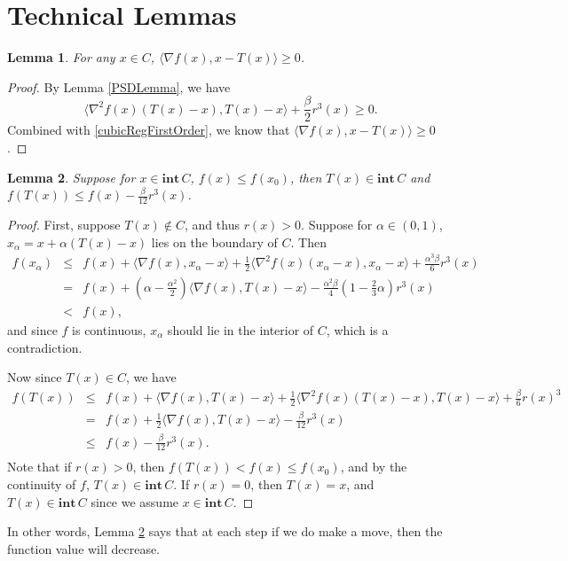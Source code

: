\documentclass[openany]{book}
\newtheorem{lemma}{Lemma}[chapter]
\theoremstyle{definition}
\theoremstyle{remark}
\begin{document}
\section{Technical Lemmas}
\begin{lemma}
    For any $x\in C$, $\langle\nabla f(x),x-T(x)\rangle\ge0$.
\end{lemma}
\begin{proof}
    By Lemma \ref{PSDLemma}, we have
    \begin{equation*}
        \langle\nabla^2f(x)(T(x)-x),T(x)-x\rangle+\frac{\beta}{2}r^3(x)\ge0.
    \end{equation*}
    Combined with \eqref{cubicRegFirstOrder}, we know that $\langle\nabla f(x),x-T(x)\rangle\ge0$.
\end{proof}
\begin{lemma}\label{funcDeltaLemma}
    Suppose for $x\in \mathbf{int}\,C$, $f(x)\le f(x_0)$, then $T(x)\in \mathbf{int}\,C$ and $f(T(x))\le f(x)-\frac{\beta}{12}r^3(x)$.
\end{lemma}
\begin{proof}
    First, suppose $T(x)\not\in C$, and thus $r(x)>0$. Suppose for $\alpha\in(0,1)$, $x_{\alpha}=x+\alpha(T(x)-x)$ lies on the boundary of $C$. Then
    \begin{equation*}
        \begin{array}{rcl}
            f(x_{\alpha}) & \le & \displaystyle f(x)+\langle\nabla f(x),x_{\alpha}-x\rangle+\frac{1}{2}\langle\nabla^2f(x)(x_{\alpha}-x),x_{\alpha}-x\rangle+\frac{\alpha^3\beta}{6}r^3(x) \\
             & = & \displaystyle f(x)+(\alpha-\frac{\alpha^2}{2})\langle\nabla f(x),T(x)-x\rangle-\frac{\alpha^2\beta}{4}(1-\frac{2}{3}\alpha)r^3(x) \\
             & < & f(x),
        \end{array}
    \end{equation*}
    and since $f$ is continuous, $x_{\alpha}$ should lie in the interior of $C$, which is a contradiction.

    Now since $T(x)\in C$, we have
    \begin{equation}
        \begin{array}{rcl}
            f(T(x)) & \le & \displaystyle f(x)+\langle\nabla f(x),T(x)-x\rangle+\frac{1}{2}\langle\nabla^2f(x)(T(x)-x),T(x)-x\rangle+\frac{\beta}{6}r(x)^3 \\
             & = & \displaystyle f(x)+\frac{1}{2}\langle\nabla f(x),T(x)-x\rangle-\frac{\beta}{12}r^3(x) \\
             & \le & \displaystyle f(x)-\frac{\beta}{12}r^3(x). \\
        \end{array}
    \end{equation}
    Note that if $r(x)>0$, then $f(T(x))<f(x)\le f(x_0)$, and by the continuity of $f$, $T(x)\in \mathbf{int}\,C$. If $r(x)=0$, then $T(x)=x$, and $T(x)\in \mathbf{int}\,C$ since we assume $x\in \mathbf{int}\, C$.
\end{proof}
In other words, Lemma \ref{funcDeltaLemma} says that at each step if we do make a move, then the function value will decrease.
\end{document}
